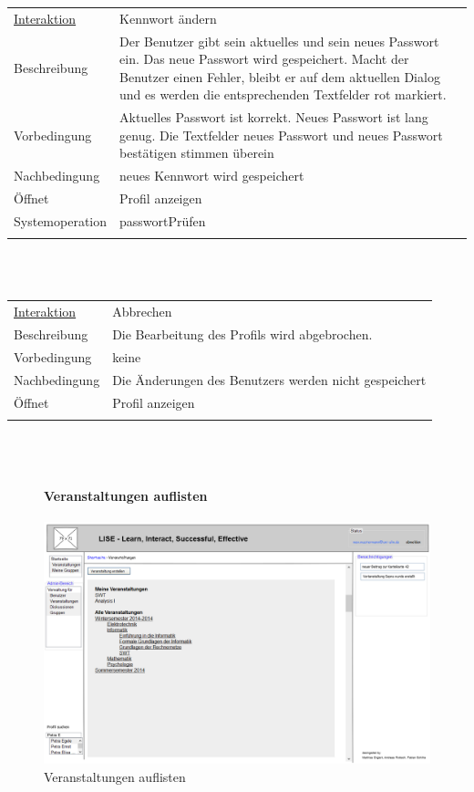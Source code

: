 \documentclass[12pt,a4paper]{article}
\begin{document}
{\begin{tabular}{l p{12cm}}
\underline{Interaktion}  	 & Kennwort ändern\\ 
Beschreibung   	 & Der Benutzer gibt sein aktuelles und sein neues Passwort ein. Das neue Passwort wird gespeichert. Macht der Benutzer einen Fehler, bleibt er auf dem aktuellen Dialog und es werden die entsprechenden Textfelder rot markiert. \\
Vorbedingung   	 & Aktuelles Passwort ist korrekt. Neues Passwort ist lang genug. Die Textfelder neues Passwort und neues Passwort bestätigen stimmen überein\\
Nachbedingung 	 & neues Kennwort wird gespeichert\\
Öffnet			 & \glqq Profil anzeigen\grqq\\
Systemoperation & passwortPrüfen\\\\
\end{tabular}\\\\

\begin{tabular}{l p{12cm}}
\underline{Interaktion} 	 & Abbrechen\\ 
Beschreibung   	 & Die Bearbeitung des Profils wird abgebrochen. \\
Vorbedingung   	 & keine\\
Nachbedingung 	 & Die Änderungen des Benutzers werden nicht gespeichert\\
Öffnet			 & \glqq Profil anzeigen\grqq\\\\
\end{tabular}\\\\  

\begin{figure}[H]
	\centering
	\paragraph{Veranstaltungen auflisten}
	\includegraphics[width=\textwidth]{Bilder/Mockups/GUI/VeranstaltungenAuflisten.png}
	\caption{Veranstaltungen auflisten}
	\label{VeranstaltungenAuflisten}
\end{figure}

}
\end{document}
